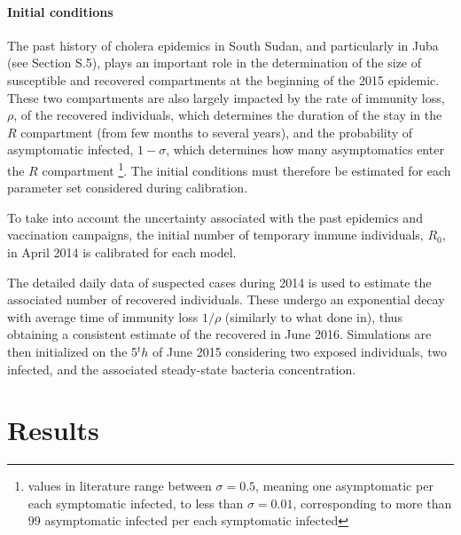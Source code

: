 \paragraph{Initial conditions} The past history of cholera epidemics in South Sudan, and particularly in Juba (see Section S.5), plays an important role in the determination of the size of susceptible and recovered compartments at the beginning of the 2015 epidemic. These two compartments are also largely impacted by the rate of immunity loss, $\rho$, of the recovered individuals, which determines the duration of the stay in the $R$ compartment (from few months to several years), and the probability of asymptomatic infected, $1-\sigma$, which determines how many asymptomatics enter the $R$ compartment \footnote{values in literature range between $\sigma=0.5$, meaning one asymptomatic per each symptomatic infected, to less than $\sigma=0.01$, corresponding to more than 99 asymptomatic infected per each symptomatic infected\parencite{Fung:CholeraTransmissionDynamic:2014}}. The initial conditions must therefore be estimated for each parameter set considered during calibration.
 
 To take into account the uncertainty associated with the past epidemics and vaccination campaigns, the initial number of temporary immune individuals, $R_0$, in April 2014 is calibrated for each model.
 
 The detailed daily data of suspected cases during 2014 is used to estimate the associated number of recovered individuals. These undergo an exponential decay with average time of immunity loss $1/\rho$ (similarly to what done in\cite{Pasetto:RealtimeProjectionsCholera:2017}), thus obtaining a consistent estimate of the recovered in June 2016. Simulations are then initialized on the 5$^th$ of June 2015 considering two exposed individuals, two infected, and the associated steady-state bacteria concentration. 
 
\section{Results}


